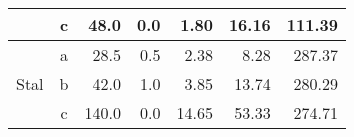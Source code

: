 \begin{table}[H]
{\begin{tabular}{|c|c|r|r|r|r|r|}
                                                                                                     & c        & 48.0                                                                               & 0.0                                                                                   & 1.80                                                                              & 16.16                                                                                       & 111.39                                                                          \\ \hline
    \multirow{3}{*}{Stal}                                                                            & a        & 28.5                                                                               & 0.5                                                                                   & 2.38                                                                              & 8.28                                                                                        & 287.37                                                                          \\ \cline{2-7} 
                                                                                                     & b        & 42.0                                                                               & 1.0                                                                                   & 3.85                                                                              & 13.74                                                                                       & 280.29                                                                          \\ \cline{2-7} 
                                                                                                     & c        & 140.0                                                                              & 0.0                                                                                   & 14.65                                                                             & 53.33                                                                                       & 274.71                                                                          \\ \hline
    \end{tabular}%
    }
    \end{table}